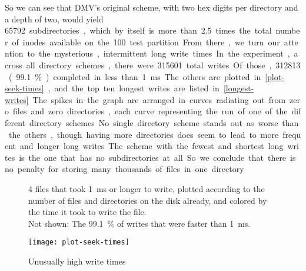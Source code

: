 So we can see that \gls{DMV}'s original scheme, with two hex digits per
directory and a depth of two, would yield \SI{65792} subdirectories, which by
itself is more than \num{2.5} times the total number of inodes available on the
\SI{100}{\mib} test partition.

From there, we turn our attention to the mysterious, intermittent long write
times. In the experiment, across all directory schemes, there were \num{315601}
total writes. Of those, \num{312813} (\SI{99.1}{\percent}) completed in less
than \SI{1}{\ms}. The others are plotted in \autoref{plot-seek-times}, and the
top ten longest writes are listed in \autoref{longest-writes}. The spikes in the
graph are arranged in curves radiating out from zero files and zero directories,
each curve representing the run of one of the different directory schemes. No
single directory scheme stands out as worse than the others, though having more
directories does seem to lead to more frequent and longer long writes. The
scheme with the fewest and shortest long writes is the one that has no
subdirectories at all. So we conclude that there is no penalty for storing many
thousands of files in one directory.


\begin{figure}[]
    \caption{Unusually high write times}
    \label{plot-seek-times}
    \centering

    \SI{4}{\kib} files that took \SI{1}{\ms} or longer to write, plotted
    according to the number of files and directories on the disk already, and
    colored by the time it took to write the file. \\
    Not shown: The \SI{99.1}{\percent} of writes that were faster than
    \SI{1}{\ms}.

    \texttt{[image: plot-seek-times]}
\end{figure}


